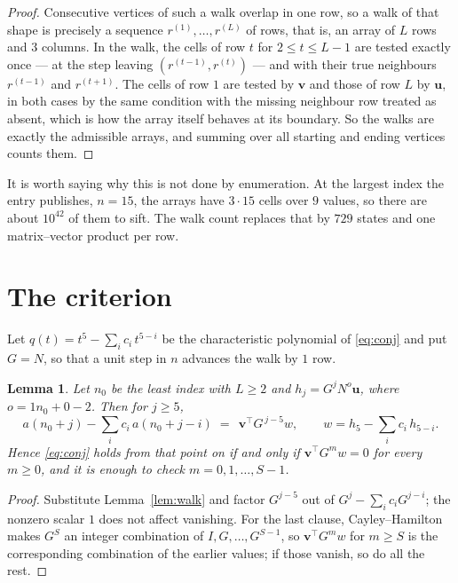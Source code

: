 \documentclass[11pt,a4paper]{article}
\theoremstyle{plain}
\newtheorem{lemma}[theorem]{Lemma}
\theoremstyle{definition}
\begin{document}
\begin{proof}
Consecutive vertices of such a walk overlap in one row, so a walk of that shape is
precisely a sequence $r^{(1)},\dots,r^{(L)}$ of rows, that is, an array of $L$ rows
and $3$ columns. In the walk, the cells of row $t$ for $2\le t\le L-1$ are tested
exactly once --- at the step leaving $(r^{(t-1)},r^{(t)})$ --- and with their true
neighbours $r^{(t-1)}$ and $r^{(t+1)}$. The cells of row $1$ are tested by
$\mathbf{v}$ and those of row $L$ by $\mathbf{u}$, in both cases by the same condition
with the missing neighbour row treated as absent, which is how the array itself behaves at
its boundary. So the walks are exactly the admissible arrays, and summing over all starting
and ending vertices counts them.
\end{proof}


It is worth saying why this is not done by enumeration. At the largest index the entry
publishes, $n=15$, the arrays have $3\cdot15$ cells over
$9$ values, so there are about $10^{42}$ of them to sift. The
walk count replaces that by $729$ states and one matrix--vector product per row.
\section{The criterion}

Let $q(t)=t^{5}-\sum_i c_i\,t^{5-i}$ be the characteristic polynomial of
\eqref{eq:conj} and put $G=N$, so that a unit step in $n$ advances the walk by
$1$ row.

\begin{lemma}\label{lem:crit}
Let $n_0$ be the least index with $L\ge2$ and $h_j=G^{j}N^{o}\mathbf{u}$, where
$o=1n_0+0-2$. Then for $j\ge5$,
\[
a(n_0+j)-\sum_i c_i\,a(n_0+j-i)\;=\;\,\mathbf{v}^{\!\top}G^{\,j-5}w,
\qquad w=h_{5}-\sum_i c_i\,h_{5-i} .
\]
Hence \eqref{eq:conj} holds from that point on if and only if
$\mathbf{v}^{\!\top}G^{m}w=0$ for every $m\ge0$, and it is enough to check
$m=0,1,\dots,S-1$.
\end{lemma}

\begin{proof}
Substitute Lemma~\ref{lem:walk} and factor $G^{j-5}$ out of
$G^{j}-\sum_ic_iG^{j-i}$; the nonzero scalar $1$ does not affect
vanishing. For the last clause, Cayley--Hamilton makes $G^{S}$ an integer combination of
$I,G,\dots,G^{S-1}$, so $\mathbf{v}^{\!\top}G^{m}w$ for $m\ge S$ is the corresponding
combination of the earlier values; if those vanish, so do all the rest.
\end{proof}
\end{document}
